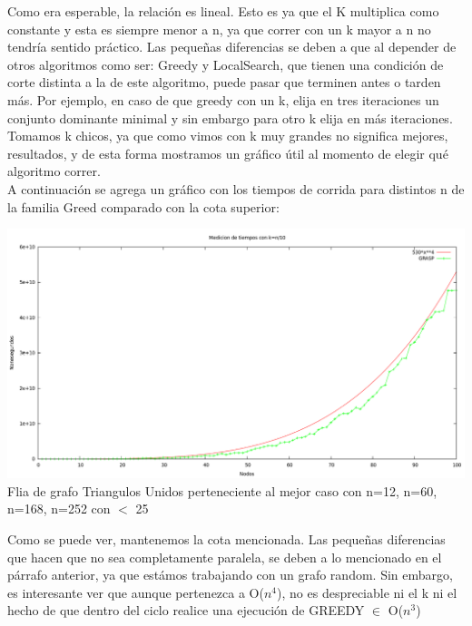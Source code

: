

Como era esperable, la relación es lineal. Esto es ya que el K multiplica como constante y esta es siempre menor a n, ya que correr con un k mayor a n no tendría sentido práctico. Las pequeñas diferencias se deben a que al depender de otros algoritmos como ser: Greedy y LocalSearch, que tienen una condición de corte distinta a la de este algoritmo, puede pasar que terminen antes o tarden más. Por ejemplo, en caso de que greedy con un k, elija en tres iteraciones un conjunto dominante minimal y sin embargo para otro k elija en más iteraciones.\\
Tomamos k chicos, ya que como vimos con k muy grandes no significa mejores, resultados, y de esta forma mostramos un gráfico útil al momento de elegir qué algoritmo correr.\\

A continuación se agrega un gráfico con los tiempos de corrida para distintos n de la familia Greed comparado con la cota superior:

\begin{center}
\includegraphics[width=17cm]{./graficos/grasp/tiempocondistintosngreedconx4.png}\\
Flia de grafo Triangulos Unidos perteneciente al mejor caso con n=12, n=60, n=168, n=252 con $<$ 25
\end{center}

Como se puede ver, mantenemos la cota mencionada. Las pequeñas diferencias que hacen que no sea completamente paralela, se deben a lo mencionado en el párrafo anterior, ya que estámos trabajando con un grafo random. Sin embargo, es interesante ver que aunque pertenezca a O($n^4$), no es despreciable ni el k ni el hecho de que dentro del ciclo realice una ejecución de GREEDY $\in$ O($n^3$)



